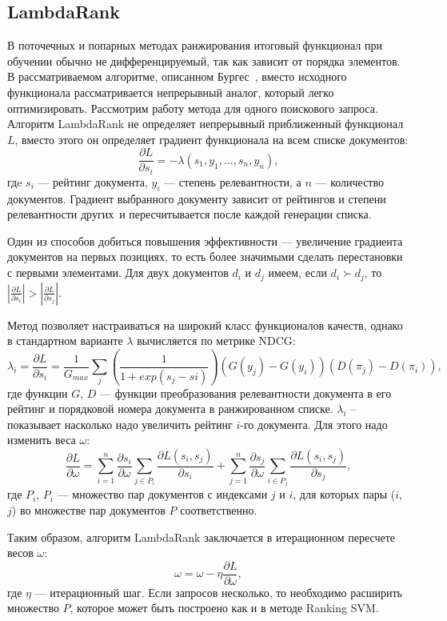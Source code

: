 \subsection{LambdaRank}

В поточечных и попарных методах ранжирования итоговый функционал при обучении обычно не дифференцируемый, так как зависит от порядка элементов. В рассматриваемом алгоритме, описанном Бургес~\cite{LamdaRank}, вместо исходного функционала рассматривается непрерывный аналог, который легко оптимизировать.
Рассмотрим работу метода для одного поискового запроса. Алгоритм LambdaRank не определяет непрерывный приближенный функционал $L$, вместо этого он определяет градиент функционала на всем списке документов:
\[
\frac{\partial L}{\partial s_{i}} = -\lambda(s_{1}, y_{1}, \dots, s_{n}, y_{n}),
\]
гдe $s_{i}$ --- рейтинг документа, $y_{i}$ --- степень релевантности, а $n$ --- количество документов. Градиент выбранного документу зависит от рейтингов и степени релевантности других\ и пересчитывается после каждой генерации списка.

Один из способов добиться повышения эффективности --- увеличение градиента документов на первых позициях, то есть более значимыми сделать перестановки с первыми элементами. Для двух документов $d_{i}$ и $d_{j}$ имеем, если $d_{i} \succ d_{j}$, то $| \frac{\partial L}{\partial s_{i}} | > | \frac{\partial L}{\partial s_{j}} |$.

Метод позволяет настраиваться на широкий класс функционалов качеств, однако в стандартном варианте $\lambda$ вычисляется по метрике NDCG:
\[
\lambda_{i} = \frac{\partial L}{\partial s_{i}} = \frac{1}{G_{max}} \sum_{j}(\frac{1}{1 + exp(s_{j} - s{i})})(G(y_{j}) - G(y_{i}))(D(\pi_{j}) - D(\pi_{i})),
\]
где функции $G$, $D$ ---  функции преобразования релевантности документа в его рейтинг и порядковой номера документа в ранжированном списке.  $\lambda_{i}$ – показывает насколько надо увеличить рейтинг $i$-го документа. Для этого надо изменить веса $\omega$:
\[
\frac{\partial L}{\partial \omega} = \sum_{i=1}^{n}\frac{\partial s_{i}}{\partial \omega}\sum_{j \in P_{i}}\frac{\partial L(s_{i}, s_{j})}{\partial s_{i}} + \sum_{j=1}^{n}\frac{\partial s_{j}}{\partial \omega}\sum_{i \in P_{j}}\frac{\partial L(s_{i}, s_{j})}{\partial s_{j}},
\]
где $P_{i}$, $P_{i}$ --- множество пар документов с индексами $j$ и $i$, для которых пары ($i$, $j$) во множестве пар документов $P$ соответственно.

Таким образом, алгоритм LambdaRank заключается в итерационном пересчете весов $\omega$:
\[
\omega = \omega - \eta\frac{\partial L}{\partial \omega},
\]
где $\eta$ --- итерационный шаг.  Если запросов несколько, то необходимо расширить множество $P$, которое может быть
построено как и в методе Ranking SVM.

